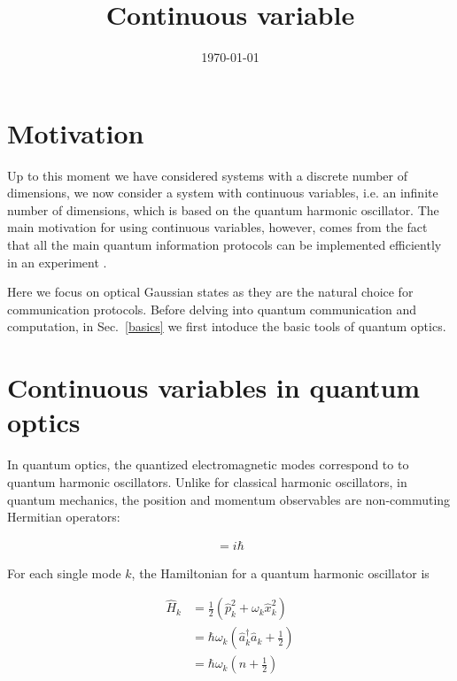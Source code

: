 \documentclass[pra,
superscriptaddress,
 amsmath,amssymb,
 aps,twocolumn]{revtex4-1}
\begin{document}

\title{Continuous variable }




\begin{abstract}

\end{abstract}

\date{\today}

\maketitle

% 
\section{Motivation}


Up to this moment we have considered systems with a discrete number of dimensions, we now consider a 
system with continuous variables, i.e. an infinite number of dimensions, which is based on the quantum harmonic oscillator. The main motivation for using continuous variables, however, comes from the fact that all the main quantum information protocols can be implemented efficiently in an experiment \cite{bib:RevModPhys.77.513}.


Here we focus on optical Gaussian states as they are the natural choice for communication protocols. Before delving into quantum communication and computation, in Sec.~\ref{basics} we first intoduce the basic tools of quantum optics.


\section{Continuous variables in quantum optics \label{basics}}



In quantum optics, the quantized electromagnetic modes correspond to to quantum harmonic oscillators. Unlike for classical harmonic oscillators, in quantum mechanics, the position and momentum observables are non-commuting Hermitian operators:


\begin{eqnarray}
[\hat x, \hat p] = i \hbar
\end{eqnarray}

For each single mode $k$, the Hamiltonian for a quantum harmonic oscillator is

\begin{align}
\hat H_k  &= \frac{1}{2}(\hat p^2_k + \omega_k \hat x^2_k) \\
		  &= \hbar \omega_k(\hat a^\dagger _k \hat a_k + \frac{1}{2}) \\
		  & = \hbar \omega_k ( n + \frac{1}{2})
\end{align}
\end{document}
